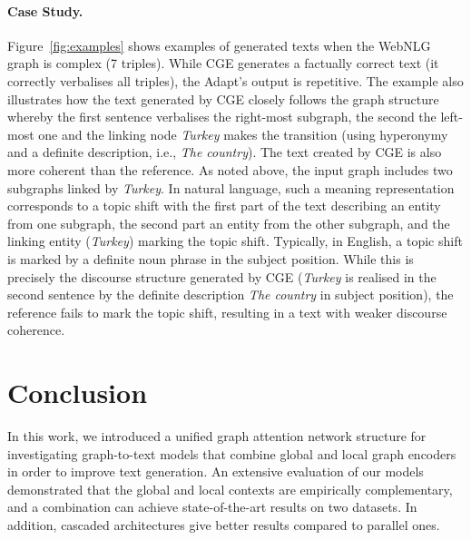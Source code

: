 \documentclass[11pt,a4paper]{article}
\begin{document}
\paragraph{Case Study.}
Figure~\ref{fig:examples} shows examples of generated texts when the WebNLG graph is complex (7 triples). While {\selectfont CGE} generates a factually correct text (it correctly verbalises all triples), the Adapt's output is repetitive. The example also illustrates how the text generated by {\selectfont CGE} closely follows the graph structure whereby the first sentence verbalises the right-most subgraph, the second the left-most one and the linking node \textit{Turkey} makes the transition (using hyperonymy and a definite description, i.e., \textit{The country}). The text created by {\selectfont CGE} is also more coherent than the reference. As noted above, the input graph includes two subgraphs linked by \textit{Turkey}. In natural language, such a meaning representation corresponds to a topic shift with the first part of the text describing an entity from one subgraph, the second part an entity from the other subgraph, and the linking entity (\textit{Turkey}) marking the topic shift. Typically, in English, a topic shift is marked by a definite noun phrase in the subject position. While this is precisely the discourse structure generated by {\selectfont CGE} (\textit{Turkey} is realised in the second sentence by the definite description \textit{The country} in subject position), the reference fails to mark the topic shift, resulting in a text with weaker discourse coherence.

















 \section{Conclusion}

In this work, we introduced a unified graph attention network structure for investigating graph-to-text models that combine global and local graph encoders in order to improve text generation. An extensive evaluation of our models demonstrated that the global and local contexts are empirically complementary, and a combination can achieve state-of-the-art results on two datasets. In addition, cascaded architectures give better results compared to parallel ones. 
\end{document}
